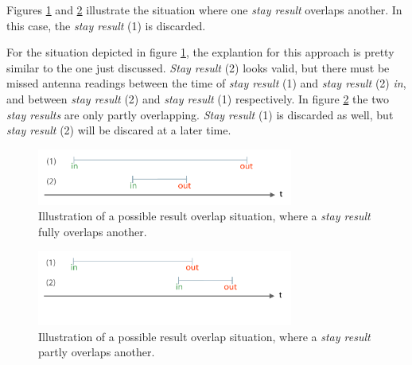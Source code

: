 Figures \ref{fig:result_overlap_single} and \ref{fig:result_overlap_single_shifted} illustrate the situation where one \textit{stay result} overlaps another. In this case, the \textit{stay result} (1) is discarded.

For the situation depicted in figure \ref{fig:result_overlap_single}, the explantion for this approach is pretty similar to the one just discussed. \textit{Stay result} (2) looks valid, but there must be missed antenna readings between the time of \textit{stay result} (1) and \textit{stay result} (2) \textit{in}, and between \textit{stay result} (2) and \textit{stay result} (1) respectively. In figure \ref{fig:result_overlap_single_shifted} the two \textit{stay results} are only partly overlapping. \textit{Stay result} (1) is discarded as well, but \textit{stay result} (2) will be discared at a later time.      

\begin{figure}[htpb]
\begin{center}
  \includegraphics[width=0.75\textwidth]{assets/pdf/result_overlaps_single_schema.pdf}
  \caption[Single result fully overlap illustration]{Illustration of a possible result overlap situation, where a \textit{stay result} fully overlaps another.}
  \label{fig:result_overlap_single}
\end{center}
\end{figure} 

\begin{figure}[htpb]
\begin{center}
  \includegraphics[width=0.75\textwidth]{assets/pdf/result_overlaps_single_shifted_schema.pdf}
  \caption[Single result partly overlap illustration]{Illustration of a possible result overlap situation, where a \textit{stay result} partly overlaps another.}
  \label{fig:result_overlap_single_shifted}
\end{center}
\end{figure}


